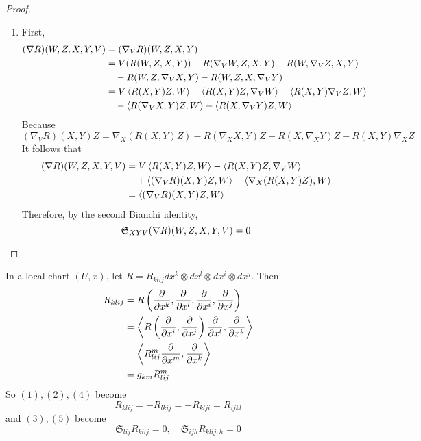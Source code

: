 \begin{enumerate}[label=\arabic{*}.]
\begin{proof}
\begin{enumerate}[label=(\arabic{*})]
			\item First,
			\begin{equation*}
				\begin{aligned}
					(\nabla R)(W,Z,X,Y,V) &= (\nabla_VR)(W,Z,X,Y) \\
					&= V(R(W,Z,X,Y)) - R(\nabla_VW,Z,X,Y) - R(W,\nabla_VZ,X,Y) \\
					&\quad - R(W,Z,\nabla_VX,Y) - R(W,Z,X,\nabla_VY) \\
					&= V\left\langle R(X,Y)Z,W \right\rangle - \left\langle R(X,Y)Z,\nabla_VW \right\rangle-\left\langle R(X,Y)\nabla_VZ,W \right\rangle\\
					&\quad -\left\langle R(\nabla_VX,Y)Z,W \right\rangle-\left\langle R(X,\nabla_VY)Z,W \right\rangle
				\end{aligned}
			\end{equation*}
			Because
			\begin{equation*}
				(\nabla_VR)(X,Y)Z = \nabla_X(R(X,Y)Z)-R(\nabla_XX,Y)Z-R(X,\nabla_XY)Z-R(X,Y)\nabla_XZ
			\end{equation*}
			It follows that
			\begin{equation*}
				\begin{aligned}
					(\nabla R)(W,Z,X,Y,V) &= V\left\langle R(X,Y)Z,W \right\rangle - \left\langle R(X,Y)Z,\nabla_VW \right\rangle \\
					&\quad+ \left\langle (\nabla_VR)(X,Y)Z,W \right\rangle - \left\langle \nabla_X(R(X,Y)Z),W \right\rangle\\
					&=\left\langle (\nabla_VR)(X,Y)Z,W \right\rangle
				\end{aligned}
			\end{equation*}
			Therefore, by the second Bianchi identity,
			\begin{equation*}
				\mathfrak{S}_{XYV}(\nabla R)(W,Z,X,Y,V) = 0 \qedhere
			\end{equation*}
		\end{enumerate}
	\end{proof}
	\begin{rmk}
		In a local chart $(U,x)$, let $R =R_{klij}dx^k\otimes dx^l \otimes dx^i \otimes dx^j$. Then
		\begin{equation*}
			\begin{aligned}
				R_{klij} &= R\left(\frac{\partial}{\partial x^k},\frac{\partial}{\partial x^l},\frac{\partial}{\partial x^i},\frac{\partial}{\partial x^j}\right) \\
				&= \left\langle R\left(\frac{\partial}{\partial x^i},\frac{\partial}{\partial x^j}\right)\frac{\partial}{\partial x^l},\frac{\partial}{\partial x^k} \right\rangle\\
				&=\left\langle R^m_{lij}\frac{\partial}{\partial x^m},\frac{\partial}{\partial x^k} \right\rangle \\
				&= g_{km}R^m_{lij}
			\end{aligned}
		\end{equation*}
		So $(1),(2),(4)$ become
		\begin{equation*}
			R_{klij} = -R_{lkij} = -R_{klji} = R_{ijkl}
		\end{equation*}
		and $(3),(5)$ become
		\begin{equation*}
			\mathfrak{S}_{lij}R_{klij} = 0,\quad \mathfrak{S}_{ijh}R_{klij;h} = 0
		\end{equation*}
	\end{rmk}


\end{enumerate}
